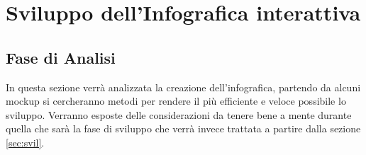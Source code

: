\clearpage{\pagestyle{empty}\cleardoublepage}
\chapter{Sviluppo dell'Infografica interattiva}

\section{Fase di Analisi}
\noindent In questa sezione verrà analizzata la creazione dell'infografica, partendo da alcuni mockup si cercheranno metodi per rendere il più efficiente e veloce possibile lo sviluppo.\newline
Verranno esposte delle considerazioni da tenere bene a mente durante quella che sarà la fase di sviluppo che verrà invece trattata a partire dalla sezione \ref{sec:svil}.
